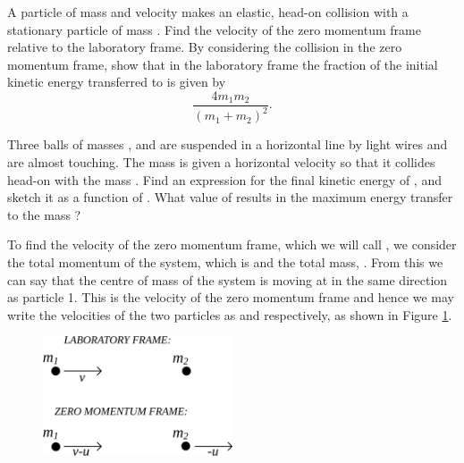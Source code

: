 
\begin{problem} 
 {A particle of mass  and velocity  makes an elastic, head-on collision with a stationary particle of mass . Find the velocity of the zero momentum frame relative to the laboratory frame. By considering the collision in the zero momentum frame, show that in the laboratory frame the fraction of the initial kinetic energy transferred to  is given by
\begin{equation}
\frac{4m_{1} m_{2}}{(m_{1}+m_{2})^{2}}.
\end{equation}
 
Three balls of masses ,  and  are suspended in a horizontal line by light wires and are almost touching. The mass  is given a horizontal velocity  so that it collides head-on with the mass . Find an expression for the final kinetic energy of , and sketch it as a function of . What value of  results in the maximum energy transfer to the mass ?}
{}
{To find the velocity of the zero momentum frame, which we will call , we consider the total momentum of the system, which is  and the total mass, . From this we can say that the centre of mass of the system is moving at  in the same direction as particle 1. This is the velocity of the zero momentum frame and hence we may write the velocities of the two particles as  and  respectively, as shown in Figure \ref{fig:Tripos_Elastic_ZMF_1}.

\begin{figure}[h]
	\centering
	\includegraphics[width=0.5\textwidth]{../../../figures/Tripos_Elastic_ZMF_1.svg}
	\caption{}\label{fig:Tripos_Elastic_ZMF_1}
\end{figure}

}
\end{problem}
